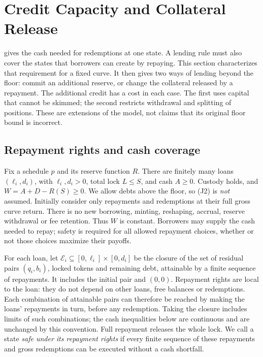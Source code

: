 \section{Credit Capacity and Collateral Release}\label{sec:credit}

 gives the cash needed for redemptions at one state. A lending rule must also cover the states that borrowers can create by repaying. This section characterizes that requirement for a fixed curve. It then gives two ways of lending beyond the floor: commit an additional reserve, or change the collateral released by a repayment. The additional credit has a cost in each case. The first uses capital that cannot be skimmed; the second restricts withdrawal and splitting of positions. These are extensions of the model, not claims that its original floor bound is incorrect.

\subsection{Repayment rights and cash coverage}\label{cr:rights}

Fix a schedule $p$ and its reserve function $R$. There are finitely many loans $(\ell_i,d_i)$, with $\ell_i,d_i>0$, total lock $L\le S$, and cash $A\ge0$. Custody holds, and $W=A+D-R(S)\ge0$. We allow debts above the floor, so (J2) is \emph{not} assumed. Initially consider only repayments and redemptions at their full gross curve return. There is no new borrowing, minting, reshaping, accrual, reserve withdrawal or fee retention. Thus $W$ is constant. Borrowers may supply the cash needed to repay; safety is required for all allowed repayment choices, whether or not those choices maximize their payoffs.

For each loan, let $\mathcal E_i\subseteq[0,\ell_i]\times[0,d_i]$ be the closure of the set of residual pairs $(q_i,b_i)$, locked tokens and remaining debt, attainable by a finite sequence of repayments. It includes the initial pair and $(0,0)$. Repayment rights are local to the loan: they do not depend on other loans, free balances or redemptions. Each combination of attainable pairs can therefore be reached by making the loans' repayments in turn, before any redemption. Taking the closure includes limits of such combinations; the cash inequalities below are continuous and are unchanged by this convention. Full repayment releases the whole lock. We call a state \emph{safe under its repayment rights} if every finite sequence of these repayments and gross redemptions can be executed without a cash shortfall.

